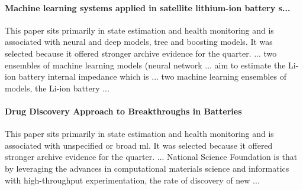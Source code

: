 \documentclass[conference]{IEEEtran}
\begin{document}
\paragraph{Machine learning systems applied in satellite lithium-ion battery s...} This paper sits primarily in state estimation and health monitoring and is associated with neural and deep models, tree and boosting models. It was selected because it offered stronger archive evidence for the quarter. ... two ensembles of machine learning models (neural network ... aim to estimate the Li-ion battery internal impedance which is ... two machine learning ensembles of models, the Li-ion battery ... \cite{machinelearningsystems2018}

\paragraph{Drug Discovery Approach to Breakthroughs in Batteries} This paper sits primarily in state estimation and health monitoring and is associated with unspecified or broad ml. It was selected because it offered stronger archive evidence for the quarter. ... National Science Foundation is that by leveraging the advances in computational materials science and informatics with high-throughput experimentation, the rate of discovery of new ... \cite{drugdiscoveryapproach2008}
\end{document}
